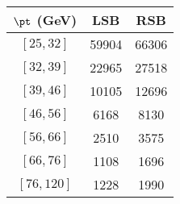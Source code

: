 \begin{tabular}{c||c|c}
$\pt$ (GeV) & LSB & RSB  \\
\hline
$[25, 32]$ & 59904 & 66306\\
$[32, 39]$ & 22965 & 27518\\
$[39, 46]$ & 10105 & 12696\\
$[46, 56]$ & 6168 & 8130\\
$[56, 66]$ & 2510 & 3575\\
$[66, 76]$ & 1108 & 1696\\
$[76, 120]$ & 1228 & 1990\\
\end{tabular}
